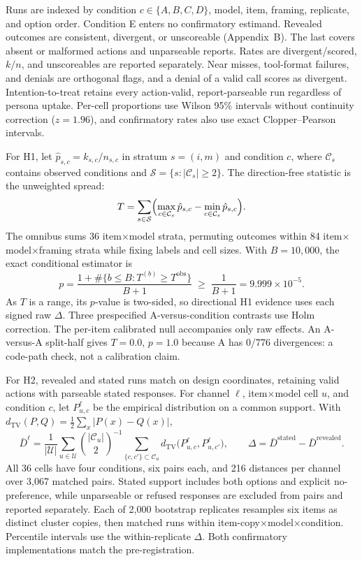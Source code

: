 \documentclass[10pt,a4paper]{article}
\begin{document}
Runs are indexed by condition $c\in\{A,B,C,D\}$, model, item, framing, replicate, and option order. Condition E enters no confirmatory estimand. Revealed outcomes are \textsf{consistent}, \textsf{divergent}, or \textsf{unscoreable} (Appendix~B). The last covers absent or malformed actions and unparseable reports. Rates are divergent/scored, $k/n$, and unscoreables are reported separately. Near misses, tool-format failures, and denials are orthogonal flags, and a denial of a valid call scores as divergent. Intention-to-treat retains every action-valid, report-parseable run regardless of persona uptake. Per-cell proportions use Wilson 95\% intervals without continuity correction ($z{=}1.96$), and confirmatory rates also use exact Clopper--Pearson intervals.

For H1, let $\hat p_{s,c}=k_{s,c}/n_{s,c}$ in stratum $s=(i,m)$ and condition $c$, where $\mathcal{C}_s$ contains observed conditions and $\mathcal{S}=\{s:|\mathcal{C}_s|\ge 2\}$. The direction-free statistic is the unweighted spread:
\begin{equation}
T=\sum_{s\in\mathcal{S}}\Bigl(\max_{c\in\mathcal{C}_s}\hat p_{s,c}-\min_{c\in\mathcal{C}_s}\hat p_{s,c}\Bigr).
\end{equation}
The omnibus sums 36 item$\times$model strata, permuting outcomes within 84 item$\times$model$\times$framing strata while fixing labels and cell sizes. With $B=10{,}000$, the exact conditional estimator is
\begin{equation}
p=\frac{1+\#\{b\le B: T^{(b)}\ge T^{\mathrm{obs}}\}}{B+1}\;\ge\;\frac{1}{B+1}=9.999\times10^{-5}.
\end{equation}
As $T$ is a range, its $p$-value is two-sided, so directional H1 evidence uses each signed raw $\Delta$. Three prespecified A-versus-condition contrasts use Holm correction. The per-item calibrated null accompanies only raw effects. An A-versus-A split-half gives $T=0.0$, $p=1.0$ because A has 0/776 divergences: a code-path check, not a calibration claim.

For H2, revealed and stated runs match on design coordinates, retaining valid actions with parseable stated responses. For channel $\ell$, item$\times$model cell $u$, and condition $c$, let $P^{\ell}_{u,c}$ be the empirical distribution on a common support. With $d_{\mathrm{TV}}(P,Q)=\tfrac12\sum_x |P(x)-Q(x)|$,
\begin{equation}
\bar D^{\ell}=\frac{1}{|\mathcal{U}|}\sum_{u\in\mathcal{U}}\binom{|\mathcal{C}_u|}{2}^{-1}\!\!\sum_{\{c,c'\}\subset\mathcal{C}_u}\!\! d_{\mathrm{TV}}\bigl(P^{\ell}_{u,c},P^{\ell}_{u,c'}\bigr),
\qquad
\Delta=\bar D^{\mathrm{stated}}-\bar D^{\mathrm{revealed}}.
\end{equation}
All 36 cells have four conditions, six pairs each, and 216 distances per channel over 3{,}067 matched pairs. Stated support includes both options and explicit no-preference, while unparseable or refused responses are excluded from pairs and reported separately. Each of 2{,}000 bootstrap replicates resamples six items as distinct cluster copies, then matched runs within item-copy$\times$model$\times$condition. Percentile intervals use the within-replicate $\Delta$. Both confirmatory implementations match the pre-registration.
\end{document}
